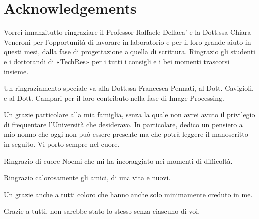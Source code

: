 \section*{Acknowledgements}

Vorrei innanzitutto ringraziare il Professor Raffaele Dellaca' e la
Dott.ssa Chiara Veneroni per l'opportunità di lavorare in laboratorio
e per il loro grande aiuto in questi mesi, dalla fase di progettazione
a quella di scrittura.  Ringrazio gli studenti e i dottorandi di
«TechRes» per i tutti i consigli e i bei momenti trascorsi insieme.

Un ringraziamento speciale va alla Dott.ssa Francesca Pennati, al
Dott. Cavigioli, e al Dott. Campari per il loro contributo nella fase
di Image Processing.

Un grazie particolare alla mia famiglia, senza la quale non avrei
avuto il privilegio di frequentare l'Università che desideravo.  In
particolare, dedico un pensiero a mio nonno che oggi non può essere
presente ma che potrà leggere il manoscritto in seguito.  Vi porto
sempre nel cuore.

Ringrazio di cuore Noemi che mi ha incoraggiato nei momenti di
difficoltà.

Ringrazio calorosamente gli amici, di una vita e nuovi.

Un grazie anche a tutti coloro che hanno anche solo minimamente
creduto in me.

Grazie a tutti, non sarebbe stato lo stesso senza ciascuno di voi.

